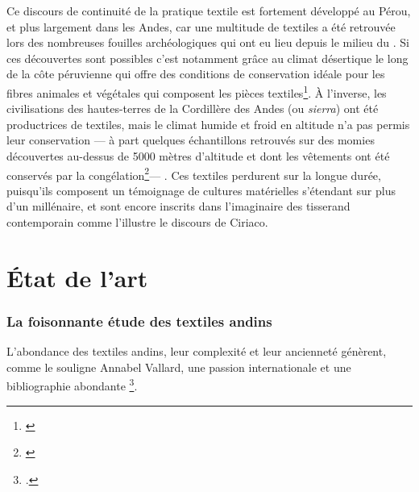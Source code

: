 Ce discours de continuité de la pratique textile est fortement développé au Pérou, et plus largement dans les Andes, car une multitude de textiles a été retrouvée lors des nombreuses fouilles archéologiques qui ont eu lieu depuis le milieu du . Si ces découvertes sont possibles c'est notamment grâce au climat désertique le long de la côte péruvienne qui offre des conditions de conservation idéale pour les fibres animales et végétales qui composent les pièces textiles\footnote{\cite[p.~263]{desrosiersTechniquesTissageOntelles2010}}. À l'inverse, les civilisations des hautes-terres de la Cordillère des Andes (ou \textit{sierra}) ont été productrices de textiles, mais le climat humide et froid en altitude n'a pas permis leur conservation --- à part quelques échantillons retrouvés sur des momies découvertes au-dessus de 5000 mètres d'altitude et dont les vêtements ont été conservés par la congélation\footnote{\cite{abalderussoArteTextilIncaico2010}}--- .
\noindent Ces textiles perdurent sur la longue durée, puisqu'ils composent un témoignage de cultures matérielles s'étendant sur plus d'un millénaire, et sont encore inscrits dans l'imaginaire des tisserand contemporain comme l'illustre le discours de Ciriaco. \\


\section*{État de l'art}

\subsubsection*{La foisonnante étude des textiles andins}

L'abondance des textiles andins, leur complexité et leur ancienneté génèrent, comme le souligne Annabel Vallard, \og une passion internationale et une bibliographie abondante \fg\footcite[p.~1]{vallardSilvermanGailWoven2009}.

